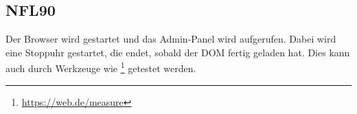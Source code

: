 \subsection*{NFL90}

Der \Gls{Browser} wird gestartet und das \Gls{Admin-Panel} wird aufgerufen.
Dabei wird eine Stoppuhr gestartet, die endet, sobald der \Gls{DOM} fertig geladen hat.
Dies kann auch durch Werkzeuge wie \footnote{\href{https://web.dev/measure}{https://web.de/measure}} getestet werden.